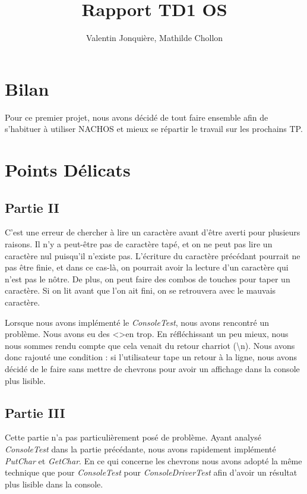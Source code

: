 \documentclass{article}
\author{
    Valentin Jonquière,
    Mathilde Chollon
}
\title{Rapport TD1 OS}
\begin{document}
\maketitle

\pagebreak

\tableofcontents

\pagebreak

\section{Bilan}

Pour ce premier projet, nous avons décidé de tout faire ensemble afin de s'habituer à utiliser NACHOS et mieux se répartir
le travail sur les prochains TP.

\section{Points Délicats}
    \subsection{Partie II}
    C'est une erreur de chercher à lire un caractère avant d'être averti pour
    plusieurs raisons. Il n'y a peut-être pas de caractère tapé, et on ne peut pas
    lire un caractère nul puisqu'il n'existe pas. L'écriture du caractère précédant
    pourrait ne pas être finie, et dans ce cas-là, on pourrait avoir la lecture
    d'un caractère qui n'est pas le nôtre. De plus, on peut faire des combos de
    touches pour taper un caractère. Si on lit avant que l'on ait fini, on se
    retrouvera avec le mauvais caractère.

    Lorsque nous avons implémenté le \textit{ConsoleTest}, nous avons rencontré un problème.
    Nous avons eu des \textless \textgreater en trop. En réfléchissant un peu
    mieux, nous nous sommes rendu compte que cela venait du retour charriot
    (\textbackslash n). Nous avons donc rajouté une condition : si l'utilisateur
    tape un retour à la ligne, nous avons décidé de le faire sans mettre de
    chevrons pour avoir un affichage dans la console plus lisible.

    \subsection{Partie III}
    Cette partie n'a pas particulièrement posé de problème. Ayant analysé \textit{ConsoleTest} dans la partie précédante, nous
    avons rapidement implémenté \textit{PutChar} et \textit{GetChar}. En ce qui concerne les chevrons nous avons adopté la même technique que
    pour \textit{ConsoleTest}  pour \textit{ConsoleDriverTest} afin d'avoir un résultat plus lisible dans la console.
\end{document}

